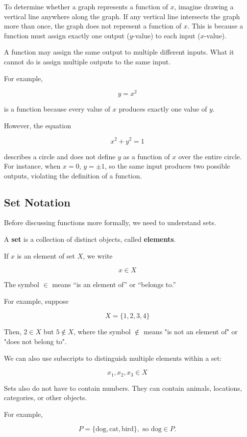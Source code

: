 \documentclass[12pt]{article}
\begin{document}
To determine whether a graph represents a function of $x$, imagine drawing a vertical line anywhere along the graph. If any vertical line intersects the graph more than once, the graph does not represent a function of $x$. This is because a function must assign exactly one output ($y$-value) to each input ($x$-value).

A function may assign the same output to multiple different inputs. What it cannot do is assign multiple outputs to the same input.

For example,

\[
y=x^2
\]

is a function because every value of $x$ produces exactly one value of $y$.

However, the equation

\[
x^2+y^2=1
\]

describes a circle and does not define $y$ as a function of $x$ over the entire circle.
For instance, when $x=0$, \(y=\pm 1\), so 
the same input produces two possible outputs, violating the definition of a function.

\subsection{Set Notation}

Before discussing functions more formally, we need to understand sets.

A \textbf{set} is a collection of distinct objects, called \textbf{elements}.

If $x$ is an element of set $X$, we write

\[
x\in X
\]

The symbol $\in$ means ``is an element of'' or ``belongs to.''

For example, suppose

\[
X=\{1,2,3,4\}
\]

Then, \(
2\in X
\)
but \(
5\notin X
\), where the symbol $\notin$ means "is not an element of" or "does not belong to".

We can also use subscripts to distinguish multiple elements within a set:

\[
x_1,x_2,x_3\in X
\]

Sets also do not have to contain numbers. They can contain animals, locations, categories, or other objects.

For example,

\[
P=\{\text{dog},\text{cat},\text{bird}\}, 
\text{ so dog}\in P. 
\]
\end{document}
